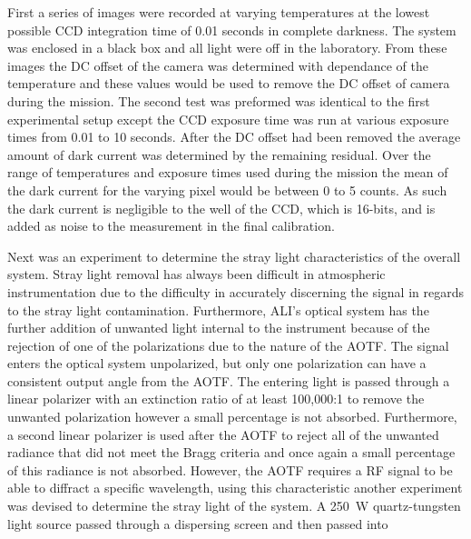 \documentclass[12pt]{article}
\begin{document}
First a series of images were recorded at varying temperatures at the lowest possible CCD integration time of 0.01 seconds in complete darkness. The system was enclosed in a black box and all light were off in the laboratory. From these images the DC offset of the camera was determined with dependance of the temperature and these values would be used to remove the DC offset of camera during the mission. The second test was preformed was identical to the first experimental setup except the CCD exposure time was run at various exposure times from 0.01 to 10 seconds. After the DC offset had been removed the average amount of dark current was determined by the remaining residual. Over the range of temperatures and exposure times used during the mission the mean of the dark current for the varying pixel would be between 0 to 5 counts. As such the dark current is negligible to the well of the CCD, which is 16-bits, and is added as noise to the measurement in the final calibration.

Next was an experiment to determine the stray light characteristics of the overall system. Stray light removal has always been difficult in atmospheric instrumentation due to the difficulty in accurately discerning the signal in regards to the stray light contamination. Furthermore, ALI's optical system has the further addition of unwanted light internal to the instrument because of the rejection of one of the polarizations due to the nature of the AOTF. The signal enters the optical system unpolarized, but only one polarization can have a consistent output angle from the AOTF. The entering light is passed through a linear polarizer with an extinction ratio of at least 100,000:1 to remove the unwanted polarization however a small percentage is not absorbed. Furthermore, a second linear polarizer is used after the AOTF to reject all of the unwanted radiance that did not meet the Bragg criteria and once again a small percentage of this radiance is not absorbed. However, the AOTF requires a RF signal to be able to diffract a specific wavelength, using this characteristic another experiment was devised to determine the stray light of the system. A 250~W quartz-tungsten light source passed through a dispersing screen and then passed into 
\end{document}
